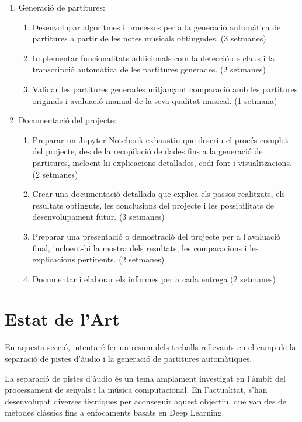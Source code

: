 \documentclass[10pt,a4paper,twocolumn,twoside]{article}
\begin{document}
\begin{enumerate}
    \item Generació de partitures:
    \begin{enumerate}
        \item Desenvolupar algoritmes i processos per a la generació automàtica de partitures a partir de les notes musicals obtingudes. (3 setmanes)
        \item Implementar funcionalitats addicionals com la detecció de claus i la transcripció automàtica de les partitures generades. (2 setmanes)
        \item Validar les partitures generades mitjançant comparació amb les partitures originals i avaluació manual de la seva qualitat musical. (1 setmana)
    \end{enumerate}
    \item Documentació del projecte:
    \begin{enumerate}
        \item Preparar un Jupyter Notebook exhaustiu que descriu el procés complet del projecte, des de la recopilació de dades fins a la generació de partitures, incloent-hi explicacions detallades, codi font i visualitzacions. (2 setmanes)
        \item Crear una documentació detallada que explica els passos realitzats, els resultats obtinguts, les conclusions del projecte i les possibilitats de desenvolupament futur. (3 setmanes)
        \item Preparar una presentació o demostració del projecte per a l'avaluació final, incloent-hi la mostra dels resultats, les comparacions i les explicacions pertinents. (2 setmanes)
        \item Documentar i elaborar els informes per a cada entrega (2 setmanes)
    \end{enumerate}
\end{enumerate}

\section{Estat de l'Art}
\label{sec:estat_art}

En aquesta secció, intentaré fer un resum dels treballs rellevants en el camp de la separació de pistes d'àudio i la generació de partitures automàtiques.

La separació de pistes d'àudio és un tema amplament investigat en l'àmbit del processament de senyals i la música computacional. En l'actualitat, s'han desenvolupat diverses tècniques per aconseguir aquest objectiu, que van des de mètodes clàssics fins a enfocaments basats en Deep Learning.
\end{document}
